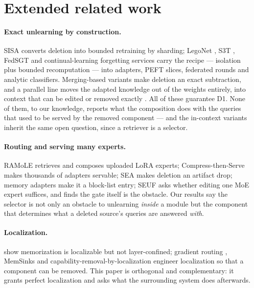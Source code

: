 \documentclass{article}
\begin{document}
\section{Extended related work}
\label{app:related}

\paragraph{Exact unlearning by construction.} SISA \citep{bourtoule2021sisa} converts deletion into
bounded retraining by sharding; LegoNet \citep{yu2022legonet}, S3T
\citep{basuroychowdhury2025s3t}, FedSGT \citep{zhang2025fedsgt} and continual-learning forgetting
services \citep{huang2025forgetting} carry the recipe --- isolation plus bounded recomputation ---
into adapters, PEFT slices, federated rounds and analytic classifiers. Merging-based variants
\citep{ilharco2023task,yu2024dare,kuo2025sift} make deletion an exact subtraction, and a parallel
line moves the adapted knowledge out of the weights entirely, into context that can be edited
\citep{pawelczyk2024icul} or removed exactly \citep{muresanu2024fastexact}. All of these guarantee
D1. None of them, to our knowledge, reports what the composition does with the queries that used to
be served by the removed component --- and the in-context variants inherit the same open question,
since a retriever is a selector.

\paragraph{Routing and serving many experts.} RAMoLE \citep{zhao2024ramole} retrieves and composes
uploaded LoRA experts; Compress-then-Serve \citep{gabrielsson2025compress} makes thousands of
adapters servable; SEA \citep{schneider2026sea} makes deletion an artifact drop; memory adapters
\citep{grimes2026memadapt} make it a block-list entry; SEUF \citep{zhuang2024seuf} asks whether
editing one MoE expert suffices, and finds the gate itself is the obstacle. Our results say the
selector is not only an obstacle to unlearning \emph{inside} a module but the component that
determines what a deleted source's queries are answered \emph{with}.

\paragraph{Localization.} \citet{maini2023localized} show memorization is localizable but not
layer-confined; gradient routing \citep{cloud2024gradrouting}, MemSinks
\citep{ghosal2025memsinks} and capability-removal-by-localization \citep{shilov2025beyond} engineer
localization so that a component can be removed. This paper is orthogonal and complementary: it
grants perfect localization and asks what the surrounding system does afterwards.
\end{document}
